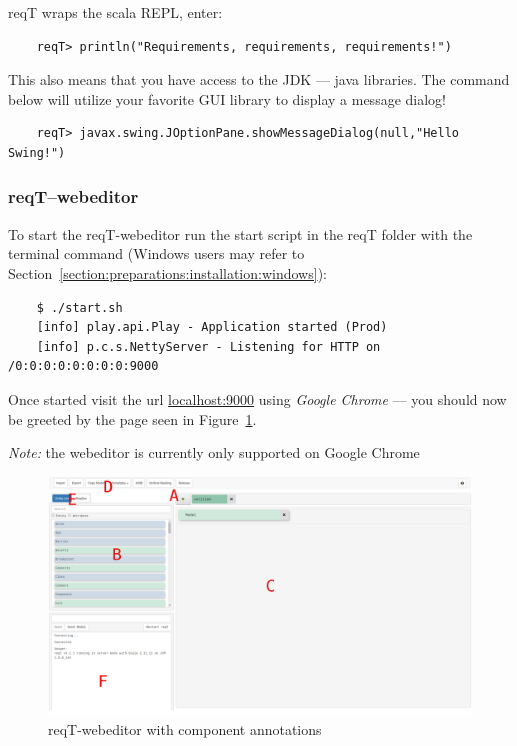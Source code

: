 \documentclass[11pt]{article}
\begin{document}
\begin{framed}
\noindent reqT wraps the scala REPL, enter:
{
  \footnotesize\begin{verbatim}
    reqT> println("Requirements, requirements, requirements!")
  \end{verbatim}
}
\noindent This also means that you have access to the JDK --- java libraries.
\noindent The command below will utilize your favorite GUI library to display a message dialog!
{
  \footnotesize\begin{verbatim}
    reqT> javax.swing.JOptionPane.showMessageDialog(null,"Hello Swing!")
  \end{verbatim}
}
\end{framed}

\subsubsection{reqT--webeditor}

\begin{framed}
\noindent To start the reqT-webeditor run the start script in the reqT folder with the terminal command (Windows users may refer to Section~\ref{section:preparations:installation:windows}):
{
  \footnotesize\begin{verbatim}
    $ ./start.sh
    [info] play.api.Play - Application started (Prod)
    [info] p.c.s.NettyServer - Listening for HTTP on /0:0:0:0:0:0:0:0:9000
  \end{verbatim}
}

\noindent Once started visit the url \url{localhost:9000} using \textit{Google Chrome} --- you should now be greeted by the page seen in Figure~\ref{figure:webeditor-expected}.
\end{framed}

\textit{Note:} the webeditor is currently only supported on Google Chrome

\begin{figure}[H]
  \centering
    \includegraphics[width=\textwidth]{reqt-webeditor-entitylist-state-annotated.png}
  \caption{reqT-webeditor with component annotations}
  \label{figure:webeditor-expected}
\end{figure}
\end{document}
